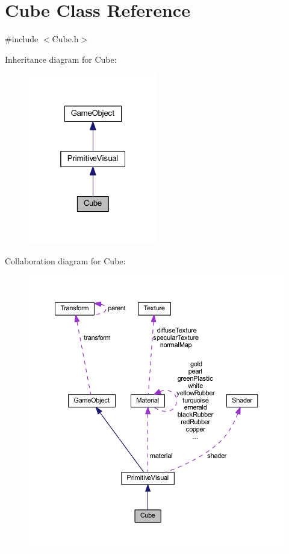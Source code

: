 \hypertarget{class_cube}{}\section{Cube Class Reference}
\label{class_cube}


{\ttfamily \#include $<$Cube.\+h$>$}



Inheritance diagram for Cube\+:\nopagebreak
\begin{figure}[H]
\begin{center}
\leavevmode
\includegraphics[width=160pt]{class_cube__inherit__graph}
\end{center}
\end{figure}


Collaboration diagram for Cube\+:\nopagebreak
\begin{figure}[H]
\begin{center}
\leavevmode
\includegraphics[width=350pt]{class_cube__coll__graph}
\end{center}
\end{figure}
